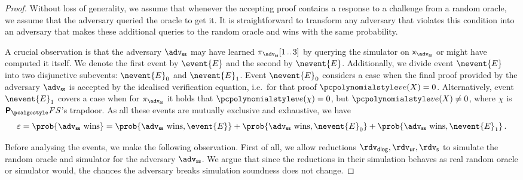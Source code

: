 \let\accentvec\vec \documentclass[runningheads,10pt]{llncs}
\begin{document}
\begin{proof}
	Without loss of generality, we assume that whenever the accepting proof contains a response to a challenge from a random oracle, we assume that the adversary queried the oracle to get it. 
	It is straightforward to transform any adversary that violates this condition into an adversary that makes these additional queries to the random oracle and wins with the same probability.

	A crucial observation is that the adversary $\advss$ may have learned $\zkproof_{\advss}\range{1}{3}$ by querying the simulator on $\inp_{\advss}$ or might have computed it itself. We denote the first event by $\event{E}$ and the second by $\nevent{E}$. 
	Additionally, we divide event $\nevent{E}$ into two disjunctive subevents: $\nevent{E}_0$ and $\nevent{E}_1$. 
	Event $\nevent{E}_0$ considers a case when the final proof provided by the adversary $\advss$ is accepted by the idealised verification equation, i.e.~for that proof $\vereq(X) = 0$. 
	Alternatively, event $\nevent{E}_1$ covers a case when for $\zkproof_\advss$ it
	holds that $\vereq(\chi) = 0$, but $\vereq(X) \neq 0$, where $\chi$ is $\plonkprotfs$'s trapdoor.
	As all these events are mutually exclusive and exhaustive, we have
	\[
		\eps = \prob{\advss \text{ wins}} = \prob{\advss \text{ wins}, \event{E}} + \prob{\advss \text{ wins}, \nevent{E}_0} + \prob{\advss \text{ wins}, \nevent{E}_1}\,.
	\]


	Before analysing the events, we make the following observation.
	First of all, we allow reductions $\rdv_\dlog, \rdvur, \rdvs$ to simulate the random oracle and simulator for the adversary $\advss$. We argue that since the reductions in their simulation behaves as real random oracle or simulator would, the chances the adversary breaks simulation soundness does not change. 


\end{proof}
\end{document}

